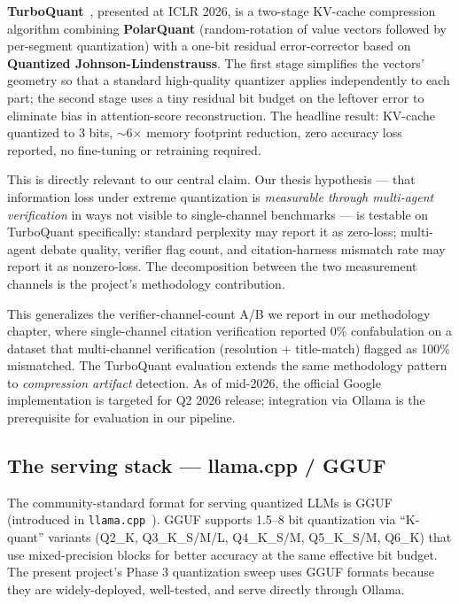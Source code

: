 \documentclass[11pt]{article}
\begin{document}
\textbf{TurboQuant}~\cite{google2026turboquant}, presented at ICLR 2026, is a two-stage KV-cache compression algorithm combining \textbf{PolarQuant} (random-rotation of value vectors followed by per-segment quantization) with a one-bit residual error-corrector based on \textbf{Quantized Johnson-Lindenstrauss}. The first stage simplifies the vectors' geometry so that a standard high-quality quantizer applies independently to each part; the second stage uses a tiny residual bit budget on the leftover error to eliminate bias in attention-score reconstruction. The headline result: KV-cache quantized to 3 bits, $\sim$6$\times$ memory footprint reduction, zero accuracy loss reported, no fine-tuning or retraining required.

This is directly relevant to our central claim. Our thesis hypothesis --- that information loss under extreme quantization is \emph{measurable through multi-agent verification} in ways not visible to single-channel benchmarks --- is testable on TurboQuant specifically: standard perplexity may report it as zero-loss; multi-agent debate quality, verifier flag count, and citation-harness mismatch rate may report it as nonzero-loss. The decomposition between the two measurement channels is the project's methodology contribution.

This generalizes the verifier-channel-count A/B we report in our methodology chapter, where single-channel citation verification reported 0\% confabulation on a dataset that multi-channel verification (resolution + title-match) flagged as 100\% mismatched. The TurboQuant evaluation extends the same methodology pattern to \emph{compression artifact} detection. As of mid-2026, the official Google implementation is targeted for Q2 2026 release; integration via Ollama is the prerequisite for evaluation in our pipeline.

\subsection{The serving stack --- llama.cpp / GGUF}

The community-standard format for serving quantized LLMs is GGUF (introduced in \texttt{llama.cpp}~\cite{gerganov2023llamacpp}). GGUF supports 1.5--8 bit quantization via ``K-quant'' variants (Q2\_K, Q3\_K\_S/M/L, Q4\_K\_S/M, Q5\_K\_S/M, Q6\_K) that use mixed-precision blocks for better accuracy at the same effective bit budget. The present project's Phase 3 quantization sweep uses GGUF formats because they are widely-deployed, well-tested, and serve directly through Ollama.
\end{document}
